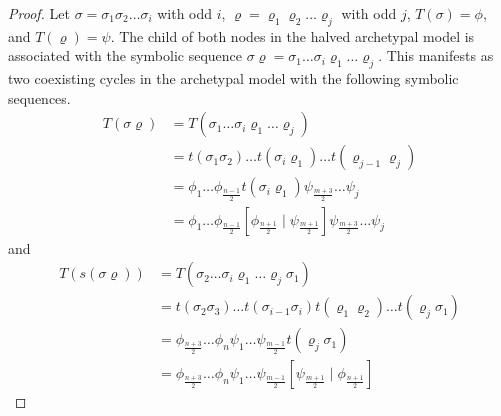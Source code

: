 \begin{proof}
	Let $\sigma = \sigma_1\sigma_2 \dots \sigma_i$ with odd $i$, $\varrho = \varrho_1\varrho_2 \dots \varrho_j$ with odd $j$, $T(\sigma) = \phi$, and $T(\varrho) = \psi$.
	The child of both nodes in the halved archetypal model is associated with the symbolic sequence $\sigma\varrho = \sigma_1 \dots \sigma_i \varrho_1 \dots \varrho_j$.
	This manifests as two coexisting cycles in the archetypal model with the following symbolic sequences.
	\begin{align*}
		T(\sigma\varrho) & = T(\sigma_1 \dots \sigma_i \varrho_1 \dots \varrho_j)                                                                            \\
		                 & = t(\sigma_1\sigma_2) \dots t(\sigma_i\varrho_1) \dots t(\varrho_{j-1}\varrho_j)                                                  \\
		                 & = \phi_1 \dots \phi_{\frac{n-1}{2}} t(\sigma_i\varrho_1) \psi_{\frac{m+3}{2}} \dots \psi_j                                        \\
		                 & = \phi_1 \dots \phi_{\frac{n-1}{2}} \left[\phi_{\frac{n+1}{2}} \mid \psi_{\frac{m+1}{2}}\right] \psi_{\frac{m+3}{2}} \dots \psi_j
	\end{align*}
	and
	\begin{align*}
		T(s(\sigma\varrho)) & = T(\sigma_2 \dots \sigma_i \varrho_1 \dots \varrho_j \sigma_1)                                                                   \\
		                    & = t(\sigma_2\sigma_3) \dots t(\sigma_{i-1}\sigma_i) t(\varrho_1\varrho_2) \dots t(\varrho_j\sigma_1)                              \\
		                    & = \phi_{\frac{n+3}{2}} \dots \phi_n \psi_1 \dots \psi_{\frac{m-1}{2}} t(\varrho_j\sigma_1)                                        \\
		                    & = \phi_{\frac{n+3}{2}} \dots \phi_n \psi_1 \dots \psi_{\frac{m-1}{2}} \left[\psi_{\frac{m+1}{2}} \mid \phi_{\frac{n+1}{2}}\right]
	\end{align*}
\end{proof}

